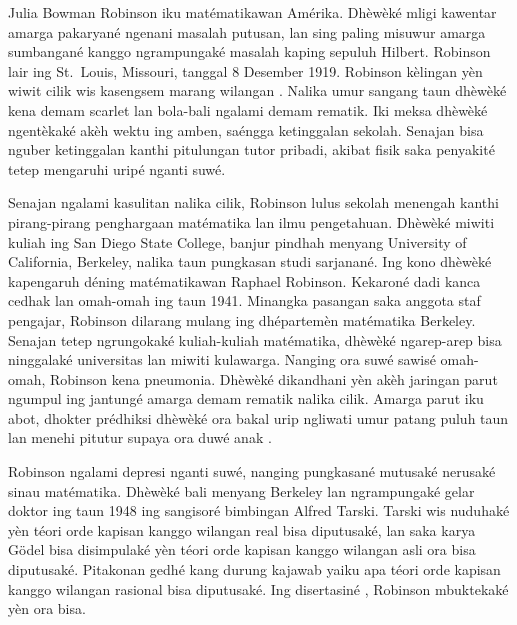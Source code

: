 \documentclass[../../../include/open-logic-section]{subfiles}
\begin{document}



Julia Bowman Robinson iku matématikawan Amérika.
Dhèwèké mligi kawentar amarga pakaryané ngenani
masalah putusan, lan sing paling misuwur amarga
sumbangané kanggo ngrampungaké masalah kaping
sepuluh Hilbert. Robinson lair ing St.~Louis,
Missouri, tanggal 8 Desember 1919. Robinson
kèlingan yèn wiwit cilik wis kasengsem marang
wilangan \citep[4]{Reid1986}. Nalika umur
sangang taun dhèwèké kena demam scarlet lan
bola-bali ngalami demam rematik. Iki meksa
dhèwèké ngentèkaké akèh wektu ing amben,
saéngga ketinggalan sekolah. Senajan bisa
nguber ketinggalan kanthi pitulungan tutor
pribadi, akibat fisik saka penyakité
tetep mengaruhi uripé nganti suwé.

Senajan ngalami kasulitan nalika cilik,
Robinson lulus sekolah menengah kanthi
pirang-pirang penghargaan matématika lan
ilmu pengetahuan. Dhèwèké miwiti kuliah
ing San Diego State College, banjur pindhah
menyang University of California, Berkeley,
nalika taun pungkasan studi sarjanané.
Ing kono dhèwèké kapengaruh déning
matématikawan Raphael Robinson. Kekaroné
dadi kanca cedhak lan omah-omah ing taun
1941. Minangka pasangan saka anggota
staf pengajar, Robinson dilarang mulang
ing dhépartemèn matématika Berkeley.
Senajan tetep ngrungokaké kuliah-kuliah
matématika, dhèwèké ngarep-arep bisa
ninggalaké universitas lan miwiti
kulawarga. Nanging ora suwé sawisé
omah-omah, Robinson kena pneumonia.
Dhèwèké dikandhani yèn akèh jaringan
parut ngumpul ing jantungé amarga
demam rematik nalika cilik. Amarga
parut iku abot, dhokter prédhiksi
dhèwèké ora bakal urip ngliwati
umur patang puluh taun lan menehi
pitutur supaya ora duwé anak
\citep[13]{Reid1986}.

Robinson ngalami depresi nganti suwé,
nanging pungkasané mutusaké nerusaké
sinau matématika. Dhèwèké bali
menyang Berkeley lan ngrampungaké
gelar doktor ing taun 1948 ing
sangisoré bimbingan Alfred Tarski.
Tarski wis nuduhaké yèn téori
orde kapisan kanggo wilangan real
bisa diputusaké, lan saka karya
G\"odel bisa disimpulaké yèn
téori orde kapisan kanggo
wilangan asli ora bisa
diputusaké. Pitakonan gedhé
kang durung kajawab yaiku
apa téori orde kapisan
kanggo wilangan rasional
bisa diputusaké. Ing
disertasiné \citeyearpar{Robinson1949},
Robinson mbuktekaké yèn
ora bisa.
\end{document}
